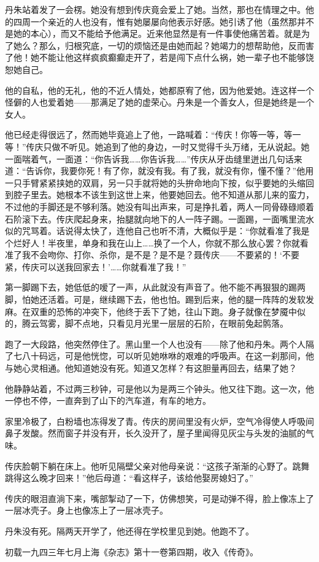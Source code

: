 \par 丹朱站着发了一会楞。她没有想到传庆竟会爱上了她。当然，那也在情理之中。他的四周一个亲近的人也没有，惟有她屡屡向他表示好感。她引诱了他（虽然那并不是她的本心），而又不能给予他满足。近来他显然是有一件事使他痛苦着。就是为了她么？那么，归根究底，一切的烦恼还是由她而起？她竭力的想帮助他，反而害了他！她不能让他这样疯疯癫癫走开了，若是闯下点什么祸，她一辈子也不能够饶恕她自己。
\par 他的自私，他的无礼，他的不近人情处，她都原宥了他，因为他爱她。连这样一个怪僻的人也爱着她——那满足了她的虚荣心。丹朱是一个善女人，但是她终是一个女人。
\par 他已经走得很远了，然而她毕竟追上了他，一路喊着：“传庆！你等一等，等一等！”传庆只做不听见。她追到了他的身边，一时又觉得千头万绪，无从说起。她一面喘着气，一面道：“你告诉我……你告诉我……”传庆从牙齿缝里迸出几句话来道：“告诉你，我要你死！有了你，就没有我。有了我，就没有你，懂不懂？”他用一只手臂紧紧挟她的双肩，另一只手就将她的头拚命地向下按，似乎要她的头缩回到腔子里去。她根本不该生到这世上来，他要她回去。他不知道从那儿来的蛮力，不过他的手脚还是不够利落。她没有叫出声来，可是挣扎着，两人一同骨碌碌顺着石阶滚下去。传庆爬起身来，抬腿就向地下的人一阵子踢。一面踢，一面嘴里流水似的咒骂着。话说得太快了，连他自己也听不清，大概似乎是：“你就看准了我是个烂好人！半夜里，单身和我在山上……换了一个人，你就不那么放心罢？你就看准了我不会吻你、打你、杀你，是不是？是不是？聂传庆——不要紧的！‘不要紧，传庆可以送我回家去！'……你就看准了我！”
\par 第一脚踢下去，她低低的嗳了一声，从此就没有声音了。他不能不再狠狠的踢两脚，怕她还活着。可是，继续踢下去，他也怕。踢到后来，他的腿一阵阵的发软发麻。在双重的恐怖的冲突下，他终于丢下了她，往山下跑。身子就像在梦魇中似的，腾云驾雾，脚不点地，只看见月光里一层层的石阶，在眼前兔起鹘落。
\par 跑了一大段路，他突然停住了。黑山里一个人也没有——除了他和丹朱。两个人隔了七八十码远，可是他恍惚，可以听见她咻咻的艰难的呼吸声。在这一刹那间，他与她心灵相通。他知道她没有死。知道又怎样？有这胆量再回去，结果了她？
\par 他静静站着，不过两三秒钟，可是他以为是两三个钟头。他又往下跑。这一次，他一停也不停，一直奔到了山下的汽车道，有车的地方。
\par 家里冷极了，白粉墙也冻得发了青。传庆的房间里没有火炉，空气冷得使人呼吸间鼻子发酸。然而窗子并没有开，长久没开了，屋子里闻得见灰尘与头发的油腻的气味。
\par 传庆脸朝下躺在床上。他听见隔壁父亲对他母亲说：“这孩子渐渐的心野了。跳舞跳得这么晚才回来！”他后母道：“看这样子，该给他娶房媳妇了。”
\par 传庆的眼泪直淌下来，嘴部掣动了一下，仿佛想笑，可是动弹不得，脸上像冻上了一层冰壳子。身上也像冻上了一层冰壳子。
\par 丹朱没有死。隔两天开学了，他还得在学校里见到她。他跑不了。
\par {}
\par *初载一九四三年七月上海《杂志》第十一卷第四期，收入《传奇》。



